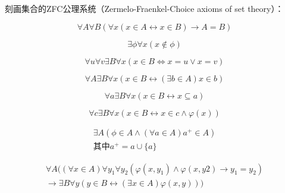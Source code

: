刻画集合的ZFC公理系统（Zermelo-Fraenkel-Choice axioms of set theory）：
  \begin{Ax}[外延公理]
    \begin{equation*}
      \forall A \forall B (\forall x (x \in A \leftrightarrow x\in B)\rightarrow A = B)
    \end{equation*}
  \end{Ax}
  \begin{Ax}[空集公理]
    \begin{equation*}
      \exists \phi \forall x (x \notin \phi)
    \end{equation*}
  \end{Ax}
  \begin{Ax}[对公理]
    \begin{equation*}
      \forall u \forall v \exists B \forall x (x \in B \Leftrightarrow x = u \lor x = v)
    \end{equation*}
  \end{Ax}
  \begin{Ax}[并集公理]
    \begin{equation*}
     \forall A \exists B \forall x (x \in B \leftrightarrow (\exists b \in A) x \in b)
    \end{equation*}
  \end{Ax}
    \begin{Ax}[幂集公理]
    \begin{equation*}
      \forall a \exists B \forall x ( x \in B \leftrightarrow x \subseteq a)
    \end{equation*}
  \end{Ax}
  \begin{Ax}[子集公理]
    \begin{equation*}
      \forall c \exists B \forall x (x \in B \leftrightarrow x \in c \land \varphi(x))
    \end{equation*}
  \end{Ax}
  \begin{Ax}[无穷公理]
    \begin{equation*}
      \begin{split}
      \exists A ( \phi \in A \land (\forall a \in A) a^+ \in A)\\
      \text{其中} a^+ = a \cup \{a\}
      \end{split}
    \end{equation*}
  \end{Ax}
    \begin{Ax}[代换公理]
    \begin{equation*}
      \begin{split}
      \forall A ((\forall x \in A) \forall y_1 \forall y_2 (\varphi(x, y_1) \land \varphi(x, y2) \rightarrow y_1 = y_2)\\
      \rightarrow \exists B \forall y (y \in B \leftrightarrow (\exists x \in A) \varphi(x, y)))
    \end{split}
  \end{equation*}
  \end{Ax}
